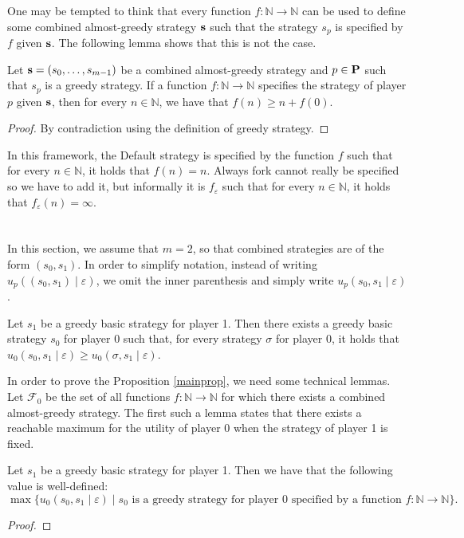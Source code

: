 \documentclass[11pt]{article}
\begin{document}

One may be tempted to think that every function $f: \mathbb{N} \to \mathbb{N}$ can be used to define some combined almost-greedy strategy $\mathbf{s}$ such that the strategy $s_p$ is specified by $f$ given $\mathbf{s}$.
The following lemma shows that this is not the case.
\begin{mylem}
Let $\mathbf{s} = (s_0, \ldots, s_{m-1})$ be a combined almost-greedy strategy and $p \in \mathbf{P}$ such that $s_p$ is a greedy strategy.  If a function $f : \mathbb{N} \to \mathbb{N}$ specifies the strategy of player $p$ given $\mathbf{s}$, then for every $n \in \mathbb{N}$, we have that  $f(n) \geq n + f(0)$.
\end{mylem}
\begin{proof}
By contradiction using the definition of greedy strategy. 
\end{proof}
In this framework, the Default strategy is specified by the function $f$ such that for every $n \in \mathbb{N}$, it holds that $f(n) = n$.  Always fork cannot really be specified so we have to add it, but informally it is $f_\varepsilon$ such that for every $n \in \mathbb{N}$, it holds that $f_\varepsilon(n) = \infty$.



\section{}

In this section, we assume that $m = 2$, so that combined strategies are of the form $(s_0,s_1)$. In order to simplify notation, instead of writing $u_p((s_0,s_1) \mid \varepsilon)$, we omit the inner parenthesis and simply write $u_p(s_0,s_1 \mid \varepsilon)$.
\begin{myprop}
\label{mainprop}
Let $s_1$ be a greedy basic strategy for player 1. Then there exists a greedy basic strategy $s_0$ for player 0 such that, for every strategy $\sigma$ for player 0, it holds that $u_0(s_0,s_1 \mid \varepsilon) \geq u_0(\sigma,s_1 \mid \varepsilon)$.
\end{myprop}
In order to prove the Proposition \ref{mainprop}, we need some technical lemmas. Let $\mathcal{F}_0$ be the set of all functions $f : \mathbb{N} \to \mathbb{N}$ for which there exists a combined almost-greedy strategy.
The first such a lemma states that there exists a reachable maximum for the utility of player $0$ when the strategy of player 1 is fixed.
\begin{mylem}
\label{limlem}
Let $s_1$ be a greedy basic strategy for player 1. Then we have that the following value is well-defined:
$$\max \{u_0(s_0,s_1 \mid \varepsilon) \mid s_0 \text{ is a greedy strategy for player } 0 \text{ specified by a function } f : \mathbb{N} \to \mathbb{N}\}.$$
\end{mylem}
\begin{proof}
\end{proof}
\end{document}

